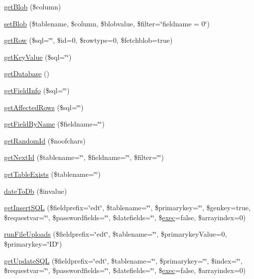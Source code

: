 \begin{DoxyCompactItemize}
\hyperlink{classDebby_a0c6292e7aae1a2161145246065dd206f}{get\+Blob} (\$column)
\item 
\hyperlink{classDebby_a6a77444ee8c09f53fa741ae96b33e55c}{set\+Blob} (\$tablename, \$column, \$blobvalue, \$filter=\char`\"{}fieldname = 0\char`\"{})
\item 
\hyperlink{classDebby_ad22b79682ec8b3d4802ed60968249fd6}{get\+Row} (\$sql=\char`\"{}\char`\"{}, \$id=0, \$rowtype=0, \$fetchblob=true)
\item 
\hyperlink{classDebby_ab7154d566317a9b0d9c2fbc9365b874f}{get\+Key\+Value} (\$sql=\char`\"{}\char`\"{})
\item 
\hyperlink{classDebby_a3db4be991273f352071c85ed7e0ba4ef}{get\+Database} ()
\item 
\hyperlink{classDebby_ad32fa25b945f492253439ed78641d469}{get\+Field\+Info} (\$sql=\char`\"{}\char`\"{})
\item 
\hyperlink{classDebby_a1659291aeee9847ff87329914a8ac695}{get\+Affected\+Rows} (\$sql=\char`\"{}\char`\"{})
\item 
\hyperlink{classDebby_ae3da5f2c30b39f32c11450f95a684613}{get\+Field\+By\+Name} (\$fieldname=\char`\"{}\char`\"{})
\item 
\hyperlink{classDebby_a2d73151aa881a7d42dcdf2cd4fd4f2d8}{get\+Random\+Id} (\$noofchars)
\item 
\hyperlink{classDebby_af7c384f77a1a616e70b936dd536e6657}{get\+Next\+Id} (\$tablename=\char`\"{}\char`\"{}, \$fieldname=\char`\"{}\char`\"{}, \$filter=\char`\"{}\char`\"{})
\item 
\hyperlink{classDebby_a40081a8f7b867ea5c145fd1a69312a5c}{get\+Table\+Exists} (\$tablename=\char`\"{}\char`\"{})
\item 
\hyperlink{classDebby_a9cb39569856f66218e9f0bd6271c4f64}{date\+To\+Db} (\$invalue)
\item 
\hyperlink{classDebby_a16d70533ec98b133bbedb916e7599176}{get\+Insert\+S\+Q\+L} (\$fieldprefix=\char`\"{}edt\char`\"{}, \$tablename=\char`\"{}\char`\"{}, \$primarykey=\char`\"{}\char`\"{}, \$genkey=true, \$requestvar=\char`\"{}\char`\"{}, \$passwordfields=\char`\"{}\char`\"{}, \$datefields=\char`\"{}\char`\"{}, \$\hyperlink{classDebby_a246a7d5268c855f26ce31f4088ce56e9}{exec}=false, \$arrayindex=0)
\item 
\hyperlink{classDebby_a243d5ab95ac9d5857be34a7db4eb6771}{run\+File\+Uploads} (\$fieldprefix=\char`\"{}edt\char`\"{}, \$tablename=\char`\"{}\char`\"{}, \$primarykey\+Value=0, \$primarykey=\char`\"{}I\+D\char`\"{})
\item 
\hyperlink{classDebby_a3361696a807a1f5a968db4cb6643c8d6}{get\+Update\+S\+Q\+L} (\$fieldprefix=\char`\"{}edt\char`\"{}, \$tablename=\char`\"{}\char`\"{}, \$primarykey=\char`\"{}\char`\"{}, \$index=\char`\"{}\char`\"{}, \$requestvar=\char`\"{}\char`\"{}, \$passwordfields=\char`\"{}\char`\"{}, \$datefields=\char`\"{}\char`\"{}, \$\hyperlink{classDebby_a246a7d5268c855f26ce31f4088ce56e9}{exec}=false, \$arrayindex=0)
\end{DoxyCompactItemize}
